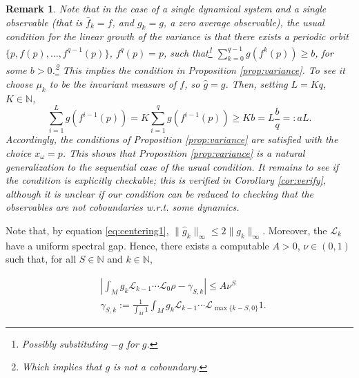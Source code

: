 \documentclass{amsart}
\numberwithin{equation}{section}
\newtheorem{rem}[thm]{Remark}
\newcommand\cL{{\mathcal L}}
\newcommand\bN{{\mathbb N}}
\begin{document}
\begin{rem}\label{rem:comparison}
Note that in the case of a single dynamical system and a single observable (that is $\bar f_k=f$, and $g_k=g$, a zero average observable), the usual condition for the linear growth of the variance is that there exists a periodic orbit $\{p, f(p), \dots, f^{q-1}(p)\}$, $f^q(p)=p$, such that\footnote{Possibly substituting $-g$ for $g$.} $\sum_{k=0}^{q-1} g( f^k(p))\geq b$, for some $b>0$.\footnote{Which implies that $g$ is not a coboundary.} This implies the condition in Proposition \ref{prop:variance}. To see it choose $\mu_k$ to be the invariant measure of $f$, so $\hat g=g$. Then, setting $L=Kq$, $K\in\bN$,
\[
\sum_{i=1}^{L} g( f^{i-1}(p))= K\sum_{i=1}^{q} g( f^{i-1}(p))\geq Kb= L\frac{b}{q}=: aL.
\]
Accordingly, the conditions of Proposition \ref{prop:variance} are satisfied with the choice $x_\omega =p$. This shows that  Proposition \ref{prop:variance} is a natural generalization to the sequential case of the usual condition. It remains to see if the condition is explicitly checkable;  this is verified in Corollary \ref{cor:verify}, although it is unclear if our condition can be reduced to checking that the observables are not coboundaries w.r.t. some dynamics.
\end{rem}
 
Note that, by equation \eqref{eq:centering1},  $\|\hat g_k\|_\infty\leq 2\|g_k\|_\infty$.
Moreover, the $\cL_k$ have a uniform spectral gap. Hence, there exists a computable $A>0$, $\nu\in (0,1)$ such that, for all $S\in\bN$ and $k\in\bN$,

\begin{equation}\label{eq:nu_decay}
\begin{split}
&\left|\int_{M} g_k \cL_{k-1}\cdots \cL_0 \rho-\gamma_{S,k}\right|\leq A\nu^S\\
&\gamma_{S,k}:=\frac{1}{\int_M 1}\int_{M} g_k \cL_{k-1}\cdots \cL_{\max\{k-S,0\}} 1.
\end{split}
\end{equation}
\end{document}
